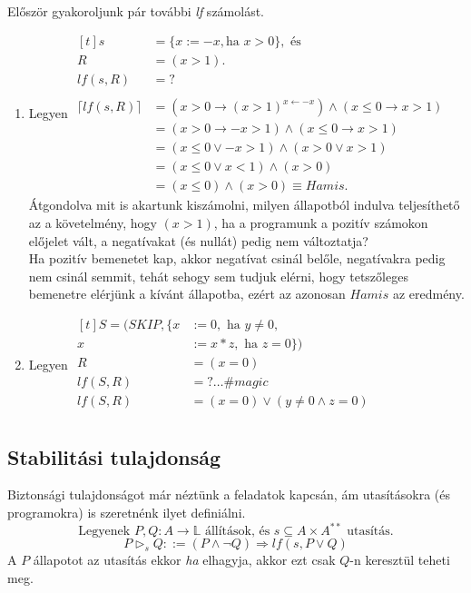 \documentclass[12pt]{article}
\begin{document}
	\paragraph{}Először gyakoroljunk pár további \textit{lf} számolást.\\
	\begin{enumerate}
		\item  Legyen $\begin{aligned}[t]
		s &= \{x := -x, \text{ha } x>0\}, \text{ és}\\
		R &= (x>1).\\
		lf(s,R) &= ? \\
		\\
		\lceil lf(s,R) \rceil &= (x>0 \rightarrow (x>1)^{x \leftarrow -x}) \land (x \le 0 \rightarrow x > 1) \\
		&= (x>0 \rightarrow -x>1 ) \land (x \le 0 \rightarrow x > 1) \\
		&= (x \le 0 \lor -x > 1) \land (x > 0 \lor x > 1) \\
		&= (x \le 0 \lor x < 1) \land (x>0) \\
		&= (x \le 0) \land (x>0) \equiv Hamis.
		\end{aligned}$\\
		Átgondolva mit is akartunk kiszámolni, milyen állapotból indulva teljesíthető az a követelmény, hogy $(x>1)$, ha a programunk a pozitív számokon előjelet vált, a negatívakat (és nullát) pedig nem változtatja?\\
		Ha pozitív bemenetet kap, akkor negatívat csinál belőle, negatívakra pedig nem csinál semmit, tehát sehogy sem tudjuk elérni, hogy tetszőleges bemenetre elérjünk a kívánt állapotba, ezért az azonosan $Hamis$ az eredmény.
		\item Legyen $\begin{aligned}[t]
		S = (SKIP, \{x&:=0, \text{ ha } y \ne 0, \\
		x&:=x*z, \text{ ha } z = 0\})\\
		R &= (x=0)\\
		lf(S,R) &= ? \dots \#magic\\
		lf(S,R) &= (x=0) \lor (y \ne 0 \land z=0)\\
		\end{aligned}$\\
	\end{enumerate}
	
	\subsection{Stabilitási tulajdonság}
	Biztonsági tulajdonságot már néztünk a feladatok kapcsán, ám utasításokra (és programokra) is szeretnénk ilyet definiálni.
	$$\text{Legyenek }P,Q: A \rightarrow \mathbb{L} \text{ állítások, és } s \subseteq A \times A^{**} \text{ utasítás.}$$
	$$P \vartriangleright_s Q ::= (P \land \neg Q) \Rightarrow lf(s, P \lor Q)$$
	A $P$ állapotot az utasítás ekkor \textit{ha} elhagyja, akkor ezt csak $Q$-n keresztül teheti meg.
	
\end{document}
